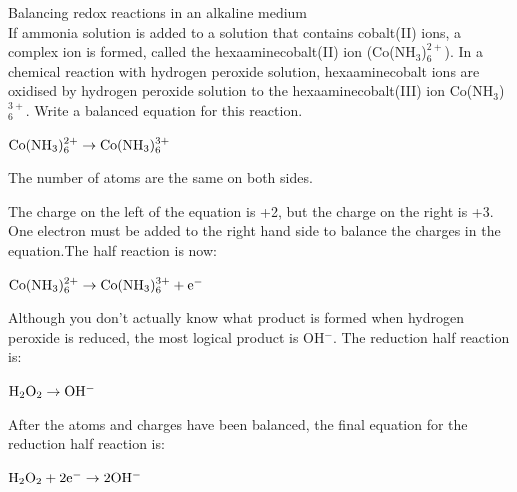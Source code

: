 \begin{wex}{Balancing redox reactions in an alkaline medium\\}{If ammonia solution is added to a solution that contains cobalt(II) ions, a complex ion is formed, called the hexaaminecobalt(II) ion (Co(NH$_{3}$)$_{6}^{2+}$). In a chemical reaction with hydrogen peroxide solution, hexaaminecobalt ions are oxidised by hydrogen peroxide solution to the hexaaminecobalt(III) ion Co(NH$_{3}$)$_{6}^{3+}$. Write a balanced equation for this reaction.\\}

{

\begin{center}
$\rm{Co(NH_{3})_{6}^{2+} \rightarrow Co(NH_{3})_{6}^{3+}}$\\
\end{center}

The number of atoms are the same on both sides.\\

The charge on the left of the equation is +2, but the charge on the right is +3. One electron must be added to the right hand side to balance the charges in the equation.The half reaction is now:

\begin{center}
$\rm{Co(NH_{3})_{6}^{2+} \rightarrow Co(NH_{3})_{6}^{3+} + e^{-}}$\\
\end{center}

Although you don't actually know what product is formed when hydrogen peroxide is reduced, the most logical product is OH$^{-}$. The reduction half reaction is:

\begin{center}
$\rm{H_{2}O_{2} \rightarrow OH^{-}}$\\
\end{center}

After the atoms and charges have been balanced, the final equation for the reduction half reaction is:

\begin{center}
$\rm{H_{2}O_{2} + 2e^{-} \rightarrow 2OH^{-}}$\\
\end{center}

}
\end{wex}
